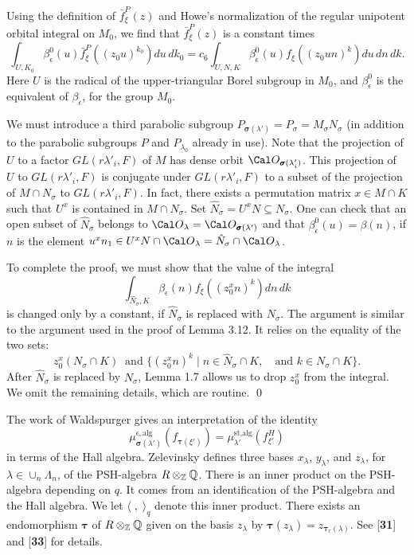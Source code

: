Using the definition of $\bar f_\xi^P(z)$ and Howe's normalization of
the regular unipotent orbital integral on $M_0$, we find that
$\bar f_\xi^P(z)$ is a constant times
$$\int_{U,K_0} \beta^0_\epsilon(u)\bar f_\xi^P((z_0u)^{k_0}) du\,dk_0 =
	c_6\int_{U,N,K} \beta_\epsilon^0(u) f_\xi((z_0un)^k) du\,dn\,dk.$$
Here $U$ is the radical of the upper-triangular Borel subgroup
in $M_0$, and $\beta_\epsilon^0$ is the equivalent of $\beta_\epsilon$,
for the group $M_0$.

We must introduce a third parabolic subgroup $P_{\pmb\sigma(\lambda')} =
P_\sigma=M_\sigma N_\sigma$ (in addition to the parabolic subgroups
$P$ and $P_{\lambda_0}$ already in use).  Note that the
projection of $U$ to a factor $GL(r\lambda'_i,F)$ of $M$ has
dense orbit ${\Cal O}_{\pmb\sigma(\lambda'_i)}$.  This projection
of $U$ to $GL(r\lambda'_i,F)$ is conjugate under $GL(r\lambda'_i,F)$ to
a subset of the projection of $M\cap N_\sigma$ to $GL(r\lambda'_i,F)$.  
In fact,
there exists a permutation matrix $x\in M\cap K$ such that $U^x$ is contained
in $M\cap N_\sigma$.  Set
$\hat N_\sigma = U^xN\subseteq N_\sigma$.  One can check that
an open subset of $\hat N_\sigma$ belongs to ${\Cal O}_\lambda = {\Cal O}_{\pmb\sigma(\lambda')}$
and that $\beta^0_\epsilon(u) = \beta(n)$, if $n$ is the element
$u^xn_1\in U^xN \cap
{\Cal O}_{\lambda} = \hat N_\sigma\cap {\Cal O}_\lambda$.

To complete the proof, we must show that the value of the integral
$$\int_{\hat N_{\sigma},K} \beta_\epsilon(n) f_\xi((z_0^xn)^k) dn\,dk$$
is changed only by a constant, if $\hat N_\sigma$ is replaced with
$N_\sigma$.  The argument is similar to the argument used in the
proof of Lemma 3.12.  It relies on the equality of the two sets:
$$z_0^x(N_\sigma\cap K)\ \text{ and } \{(z_0^xn)^k\mid n\in \hat N_\sigma\cap K,
\quad \text{and } k\in N_\sigma\cap K\}.$$
After $\hat N_\sigma$ is replaced by $N_\sigma$, Lemma 1.7 allows us to drop
$z_0^x$ from the integral.  We omit the remaining details, which are routine.
\qed\finishpproclaim

\newpage
\noindent
{}

\medskip
\noindent
The work of Waldspurger gives an interpretation of the identity
  $$ \mu_{\pmb\sigma(\lambda')}^{\epsilon,\text{alg}} 
    (f_{\pmb\tau(\xi')}) =
    \mu_{\lambda'}^{\text{st,alg}}(f_{\xi'}^{H}) $$
in terms of the Hall algebra.
Zelevinsky defines three bases
  $ x_{\lambda} $,
  $ y_{\lambda} $, and
  $ z_{\lambda} $,
  for $\lambda \in \cup_n \Lambda_n$,
of the PSH-algebra $R\otimes_{\Bbb Z} {\Bbb Q}$.
There is an inner product on the PSH-algebra depending on $q$. It comes
from an identification of the PSH-algebra and the Hall algebra.
We let
  $ \langle \;,\; \rangle_q $
denote this inner product.
There exists an endomorphism
  $ \pmb\tau $
of 
  $ R \otimes_{\Bbb Z} {\Bbb Q} $
given on the basis
  $ z_{\lambda} $
by
  $ \pmb\tau (z_{\lambda}) =
    z_{\pmb\tau_r (\lambda) } $.
See [{\bf 31}] and [{\bf 33}] for details.



